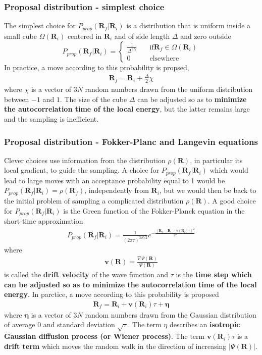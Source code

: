 \documentclass[twoside,english]{uiofysmaster}
\begin{document}
\subsubsection{Proposal distribution - simplest choice}
The simplest choice for $P_{prop} (\bm{R}_f | \bm{R}_i)$ is a distribution that is uniform inside a small cube $\Omega(\bm{R}_i)$ centered in $\bm{R}_i$ and of side length $\Delta$ and zero outside
\[ P_{prop} (\bm{R}_f | \bm{R}_i) = \begin{cases}
				 \frac{1}{\Delta^{3N}} & \quad \text{if} \bm{R}_f \in \Omega(\bm{R}_i) \\
				 0 & \quad \text{elsewhere}  
\end{cases} \]
In practice, a move according to this probability is propsed,
\begin{align}
	\bm{R}_f = \bm{R}_i + \frac{\Delta}{2} \chi
\end{align}
where $\chi$ is a vector of $3N$ random numbers drawn from the uniform distribution between $-1$ and $1$. The size of the cube $\Delta$ can be adjusted so as to \textbf{minimize the autocorrelation time of the local energy}, but the latter remains large and the sampling is inefficient.
\cite{Toulouse2016}

\subsubsection{Proposal distribution - Fokker-Planc and Langevin equations}
Clever choices use information from the distribution $\rho(\bm{R})$, in particular its local gradient, to guide the sampling. A choice for $P_{prop} (\bm{R}_f | \bm{R}_i)$ which would lead to large moves with an acceptance probability equal to 1 would be $P_{prop} (\bm{R}_f | \bm{R}_i) = \rho(\bm{R}_f)$, independently from $\bm{R}_i$, but we would then be back to the initial problem of sampling a complicated distribution $\rho(\bm{R})$. A good choice for $P_{prop} (\bm{R}_f | \bm{R}_i)$ is the Green function of the Fokker-Planck equation in the short-time approximation
\begin{align}
	P_{prop} (\bm{R}_f | \bm{R}_i) = 
	\frac{1}{(2\pi \tau)^{3N/2}}
	e^{- \frac{ ( \bm{R}_f - \bm{R}_i -\bm{v}(\bm{R}_i)\tau )^2 }{ 2\tau } }
\end{align}
where
\begin{align}
	\bm{v}(\bm{R}) = \frac{ \nabla \Psi (\bm{R}) }{ \Psi (\bm{R}) }
\end{align}
is called the \textbf{drift velocity} of the wave function and $\tau$ is the \textbf{time step which can be adjusted so as to minimize the autocorrelation time of the local energy}. In parctice, a move according to this probability is proposed
\begin{align}
	\bm{R}_f = \bm{R}_i + \bm{v} (\bm{R}_i) \tau + \bm{\eta}
\end{align}
where $\bm{\eta}$ is a vector of $3N$ random numbers drawn from the Gaussian distribution of average 0 and standard deviation $\sqrt{\tau}$. The term $\eta$ describes an \textbf{isotropic Gaussian diffusion process (or Wiener process)}. The term $\bm{v}(\bm{R}_i) \tau$ is a \textbf{drift term} which moves the random walk in the direction of increasing $| \Psi (\bm{R})|$. 
\end{document}
